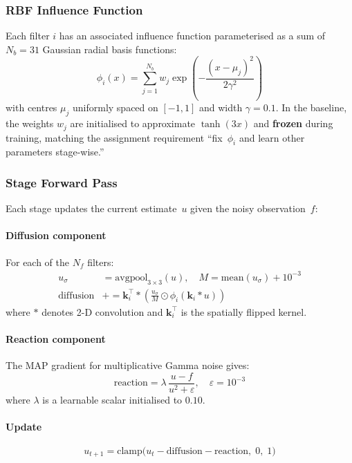\documentclass[10pt,conference]{IEEEtran}
\begin{document}
\subsubsection{RBF Influence Function}

Each filter $i$ has an associated influence function parameterised as a sum of
$N_b{=}31$ Gaussian radial basis functions:
\begin{equation}
\phi_i(x) = \sum_{j=1}^{N_b} w_j \exp\!\left(-\frac{(x - \mu_j)^2}{2\gamma^2}\right)
\end{equation}
with centres $\mu_j$ uniformly spaced on $[-1,1]$ and width $\gamma{=}0.1$.
In the baseline, the weights $w_j$ are initialised to approximate $\tanh(3x)$
and \textbf{frozen} during training, matching the assignment requirement
``fix~$\phi_i$ and learn other parameters stage-wise.''

\subsubsection{Stage Forward Pass}

Each stage updates the current estimate~$u$ given the noisy observation~$f$:

\paragraph{Diffusion component}
For each of the $N_f$ filters:
\begin{align}
u_\sigma &= \text{avgpool}_{3\times3}(u), \quad M = \text{mean}(u_\sigma) + 10^{-3} \\
\text{diffusion} &\mathrel{+}= \mathbf{k}_i^{\!\top} \ast \!\left(\frac{u_\sigma}{M}\odot \phi_i(\mathbf{k}_i \ast u)\right)
\end{align}
where $\ast$ denotes 2-D convolution and $\mathbf{k}_i^{\!\top}$ is the
spatially flipped kernel.

\paragraph{Reaction component}
The MAP gradient for multiplicative Gamma noise gives:
\begin{equation}
\text{reaction} = \lambda\,\frac{u - f}{u^2 + \varepsilon}, \quad \varepsilon = 10^{-3}
\end{equation}
where $\lambda$ is a learnable scalar initialised to $0.10$.

\paragraph{Update}
\begin{equation}
u_{t+1} = \text{clamp}\!\bigl(u_t - \text{diffusion} - \text{reaction},\; 0,\; 1\bigr)
\end{equation}
\end{document}
